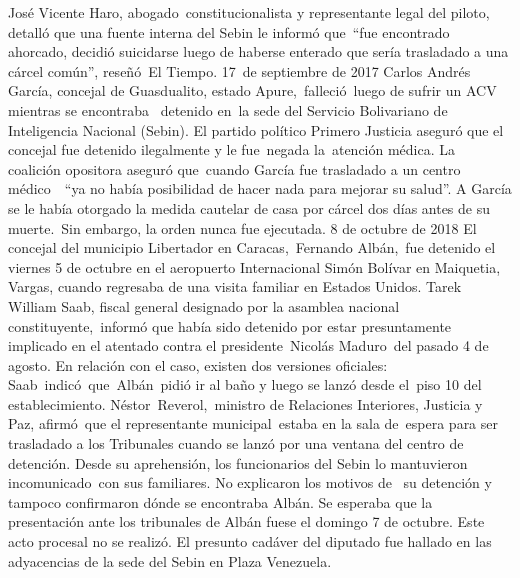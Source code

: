 \documentclass{article}%
\begin{document}
\newline%
%
José Vicente Haro, abogado~constitucionalista y representante legal del piloto, detalló que una fuente interna del Sebin le informó que~“fue encontrado ahorcado, decidió suicidarse luego de haberse enterado que sería trasladado a una cárcel común”, reseñó~El Tiempo.%
\newline%
%
17~de septiembre de 2017%
\newline%
%
Carlos Andrés García, concejal de Guasdualito, estado Apure,~falleció~luego de sufrir un ACV mientras se encontraba ~detenido en~la sede del Servicio Bolivariano de Inteligencia Nacional (Sebin).%
\newline%
%
El partido político Primero Justicia aseguró que el concejal fue detenido ilegalmente y le fue~negada la~atención médica. La coalición opositora aseguró que~cuando García fue trasladado a un centro médico~~“ya no había posibilidad de hacer nada para mejorar su salud”.%
\newline%
%
A García se le había otorgado la medida cautelar de casa por cárcel dos días antes de su muerte.~Sin embargo, la orden nunca fue ejecutada.%
\newline%
%
8 de octubre de 2018%
\newline%
%
El concejal del municipio Libertador en Caracas,~Fernando Albán,~fue detenido el viernes 5 de octubre en el aeropuerto Internacional Simón Bolívar en Maiquetia, Vargas, cuando regresaba de una visita familiar en Estados Unidos.%
\newline%
%
Tarek William Saab, fiscal general designado por la asamblea nacional constituyente,~informó que había sido detenido por estar presuntamente implicado en el atentado contra el presidente~Nicolás Maduro~del pasado 4 de agosto.%
\newline%
%
En relación con el caso, existen dos versiones oficiales:%
\newline%
%
Saab~indicó~que~Albán~pidió ir al baño y luego se lanzó desde el~piso 10 del establecimiento.%
\newline%
%
Néstor~Reverol,~ministro de Relaciones Interiores, Justicia y Paz, afirmó~que el representante municipal~estaba en la sala de~espera para ser trasladado a los Tribunales cuando se lanzó por una ventana del centro de detención.%
\newline%
%
Desde su aprehensión, los funcionarios del Sebin lo mantuvieron incomunicado~con sus familiares. No explicaron los motivos de~ su detención y tampoco confirmaron dónde se encontraba Albán.%
\newline%
%
Se esperaba que la presentación ante los tribunales de Albán fuese el domingo 7 de octubre. Este acto procesal no se realizó.%
\newline%
%
El presunto cadáver del diputado fue hallado en las adyacencias de la sede del Sebin en Plaza Venezuela.%
\newline%
%
\end{document}
